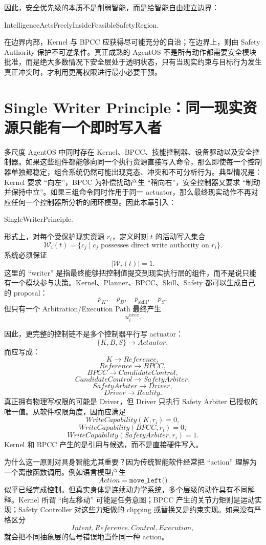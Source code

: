 因此，安全优先级的本质不是削弱智能，而是给智能自由建立边界：
\begin{statementbox}
IntelligenceActsFreelyInsideFeasibleSafetyRegion.
\end{statementbox}
在边界内部，Kernel 与 BPCC 应获得尽可能充分的自治；在边界上，则由 Safety Authority 保护不可逆条件。真正成熟的 AgentOS 不是所有动作都需要安全模块批准，而是绝大多数情况下安全层处于透明状态，只有当现实约束与目标行为发生真正冲突时，才利用更高权限进行最小必要干预。

\section{Single Writer Principle：同一现实资源只能有一个即时写入者}

多尺度 AgentOS 中同时存在 Kernel、BPCC、技能控制器、设备驱动以及安全控制器。如果这些组件都能够向同一个执行资源直接写入命令，那么即使每一个控制器单独都稳定，组合系统仍然可能出现竞态、冲突和不可分析行为。典型情况是：Kernel 要求 ``向左''，BPCC 为补偿扰动产生 ``稍向右''，安全控制器又要求 ``制动并保持中立''。如果三组命令同时作用于同一 actuator，那么最终现实动作不再对应任何一个控制器所分析的闭环模型。因此本章引入：
\begin{statementbox}
SingleWriterPrinciple.
\end{statementbox}

形式上，对每个受保护现实资源 $r_i$，定义时刻 $t$ 的活动写入集合
\[
\mathcal W_i(t)
=
\{
c_j
\mid
c_j
\text{ possesses direct write authority on }r_i
\}.
\]
系统必须保证
\[
\boxed{
|\mathcal W_i(t)|=1.
}
\]
这里的 ``writer'' 是指最终能够把控制值提交到现实执行层的组件，而不是说只能有一个模块参与决策。Kernel、Planner、BPCC、Skill、Safety 都可以生成自己的 proposal：
\[
p_K,\quad
p_B,\quad
p_{\mathrm{skill}},\quad
p_S,
\]
但只有一个 Arbitration/Execution Path 最终产生
\[
u_i^{exec}.
\]

因此，更完整的控制链不是多个控制器平行写 actuator：
\[
\{K,B,S\}\rightarrow Actuator,
\]
而应写成：
\[
K
\rightarrow
Reference,
\]
\[
Reference
\rightarrow
BPCC,
\]
\[
BPCC
\rightarrow
CandidateControl,
\]
\[
CandidateControl
\rightarrow
SafetyArbiter,
\]
\[
SafetyArbiter
\rightarrow
Driver,
\]
\[
Driver
\rightarrow
Reality.
\]
真正拥有物理写权限的可能是 Driver，但 Driver 只执行 Safety Arbiter 已授权的唯一值。从软件权限角度，因而应满足
\[
WriteCapability(K,r_i)=0,
\]
\[
WriteCapability(BPCC,r_i)=0,
\]
\[
WriteCapability(SafetyArbiter,r_i)=1.
\]
Kernel 和 BPCC 产生的是引用与候选，而不是直接硬件写入。

为什么这一原则对具身智能尤其重要？因为传统智能软件经常把 ``action'' 理解为一个离散函数调用。例如语言模型产生
\[
Action=\texttt{move\_left()}
\]
似乎已经完成控制。但真实身体是连续动力学系统，多个层级的动作具有不同解释。Kernel 所谓 ``向左移动'' 可能是任务意图；BPCC 产生的关节力矩则是运动实现；Safety Controller 对这些力矩做的 clipping 或替换又是约束实现。如果没有严格区分
\[
Intent,
Reference,
Control,
Execution,
\]
就会把不同抽象层的信号错误地当作同一种 action。

